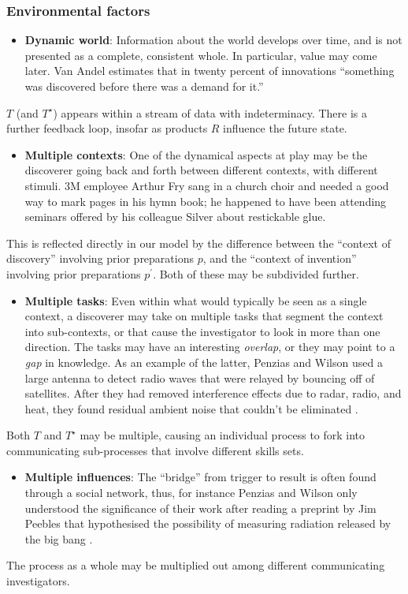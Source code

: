 \subsubsection*{Environmental factors}

\begin{itemize}
\item \textbf{Dynamic world}: Information about the world develops
  over time, and is not presented as a complete, consistent whole.  In
  particular, value may come later.  Van Andel
  \citeyear[p. 643]{van1994anatomy} estimates that in twenty percent
  of innovations ``something was discovered before there was a demand
  for it.''
\end{itemize}
%
$T$ (and $T^\star$) appears within a stream of data with
  indeterminacy.  There is a further feedback loop, insofar as
  products $R$ influence the future state.
\begin{itemize}
\item \textbf{Multiple contexts}: One of the dynamical aspects at play
  may be the discoverer going back and forth between different
  contexts, with different stimuli.  3M employee Arthur Fry sang in a
  church choir and needed a good way to mark pages in his hymn book;
  he happened to have been attending seminars offered by his colleague
  Silver about restickable glue.
\end{itemize}
%
This is reflected directly in our model by the difference
  between the ``context of discovery'' involving prior preparations
  $p$, and the ``context of invention'' involving prior preparations
  $p^{\prime}$.  Both of these may be subdivided further.
\begin{itemize}
\item \textbf{Multiple tasks}: Even within what would typically be
  seen as a single context, a discoverer may take on multiple tasks
  that segment the context into sub-contexts, or that cause the
  investigator to look in more than one direction.  The tasks may have
  an interesting \emph{overlap}, or they may point to a \emph{gap} in
  knowledge.  As an example of the latter, Penzias and Wilson used a
  large antenna to detect radio waves that were relayed by bouncing
  off of satellites.  After they had removed interference effects due
  to radar, radio, and heat, they found residual ambient noise that
  couldn't be eliminated \cite{wiki:cosmic-radiation}.
\end{itemize}
%
Both $T$ and $T^\star$ may be multiple, causing an
  individual process to fork into communicating sub-processes that
  involve different skills sets.
\begin{itemize}
\item \textbf{Multiple influences}: The ``bridge'' from trigger to
  result is often found through a social network, thus, for instance
  Penzias and Wilson only understood the significance of their work
  after reading a preprint by Jim Peebles that hypothesised the
  possibility of measuring radiation released by the big bang
  \cite{wiki:cosmic-radiation}.
\end{itemize}
%
The process as a whole may be multiplied out among
different communicating investigators.


